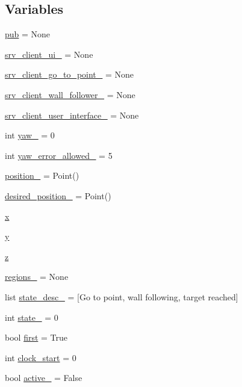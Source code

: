 \subsection*{Variables}
\begin{DoxyCompactItemize}
\item 
\hyperlink{namespacebug__m_adc14150838edf40c8028207cd6bb2082}{pub} = None
\item 
\hyperlink{namespacebug__m_adc5006acf60c13dce69dfffa2e1d0e2a}{srv\+\_\+client\+\_\+ui\+\_\+} = None
\item 
\hyperlink{namespacebug__m_abd32bbd25b55f71e56505e72ba56c2f6}{srv\+\_\+client\+\_\+go\+\_\+to\+\_\+point\+\_\+} = None
\item 
\hyperlink{namespacebug__m_af40e8063430e5b54ef2f3f8368338744}{srv\+\_\+client\+\_\+wall\+\_\+follower\+\_\+} = None
\item 
\hyperlink{namespacebug__m_ac6217733c79e361a3bf86e4f51b6ecfd}{srv\+\_\+client\+\_\+user\+\_\+interface\+\_\+} = None
\item 
int \hyperlink{namespacebug__m_a8b5b5c9259592b8efd526c5adb95d95b}{yaw\+\_\+} = 0
\item 
int \hyperlink{namespacebug__m_a23e5e76f14d9d0d139767cb229a53dda}{yaw\+\_\+error\+\_\+allowed\+\_\+} = 5
\item 
\hyperlink{namespacebug__m_ab108d02234aa3ec58605b9f6980ec090}{position\+\_\+} = Point()
\item 
\hyperlink{namespacebug__m_a8fb60e35f164091fe3355d3a0bce95af}{desired\+\_\+position\+\_\+} = Point()
\item 
\hyperlink{namespacebug__m_af10f89c7f929c9babce108f5d7382996}{x}
\item 
\hyperlink{namespacebug__m_ab8596d2ae799585b0d89152b55891aa8}{y}
\item 
\hyperlink{namespacebug__m_afbb54887da57b97920c8d36c6daed1fc}{z}
\item 
\hyperlink{namespacebug__m_ac9d4d95c034fca5a2b5d08ea845bbfcb}{regions\+\_\+} = None
\item 
list \hyperlink{namespacebug__m_ae70f71d3816862f72790fae7bfaa543b}{state\+\_\+desc\+\_\+} = \mbox{[}\textquotesingle{}Go to point\textquotesingle{}, \textquotesingle{}wall following\textquotesingle{}, \textquotesingle{}target reached\textquotesingle{}\mbox{]}
\item 
int \hyperlink{namespacebug__m_a79dc362dff5bef439beacdd5c0c3b2f1}{state\+\_\+} = 0
\item 
bool \hyperlink{namespacebug__m_ae17fcdd9f4bb70982175997ec3b37fdc}{first} = True
\item 
int \hyperlink{namespacebug__m_aae90b9eab9f94959ccd1b8e34d6cb837}{clock\+\_\+start} = 0
\item 
bool \hyperlink{namespacebug__m_aac2be257b1acdebfb27dab0e311550d4}{active\+\_\+} = False
\end{DoxyCompactItemize}


